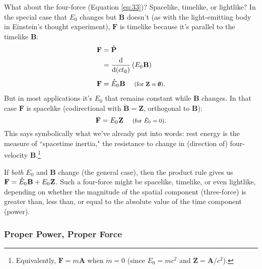 \documentclass[12pt]{article}
\renewcommand{\vv}[1]{\mathbf{#1}}
\newcommand{\dd}[1]{\mathrm{d}#1}
\begin{document}
What about the four-force (Equation \ref{eq:33})? Spacelike, timelike, or lightlike? In the special case that $E_0$ changes but $\vv B$ doesn't (as with the light-emitting body in Einstein's thought experiment), $\vv F$ is timelike because it's parallel to the timelike $\vv B$:
\begin{equation}\label{eq:38}
\begin{split}
\vv F &= \mathring{\vv P}\\
&= \frac{\dd}{\dd (c t_0)} \left( E_0 \mkern.5mu \vv B \right) \\[4pt]
\vv F &= \mathring E_0 \mkern.5mu \vv B \quad \textrm{\footnotesize{ (for $\vv Z = \textrm{\mbox{\boldmath $\emptyset$}}$)}}.
\end{split}
\end{equation}
But in most applications it's $E_0$ that remains constant while $\vv B$ changes. In that case $\vv F$ is spacelike (codirectional with $\mathring{\vv B} = \vv Z$, orthogonal to $\vv B$):
\begin{equation}\label{eq:39}
\vv F = E_0 \mkern.5mu \vv Z \quad \textrm{\footnotesize{ (for $\mathring{E}_0 = 0$)}}.
\end{equation}
This says symbolically what we've already put into words: rest energy is the measure of ``spacetime inertia," the resistance to change in (direction of) four-velocity $\vv B$.\footnote{Equivalently, $\vv F = m \vv A$ when $\mathring{m} = 0$ (since $E_0 = mc^2$ and $\vv Z = \vv A / c^2$).}

If \emph{both} $E_0$ and $\vv B$ change (the general case), then the product rule gives us $\vv F = \mathring E_0 \mkern.5mu \vv B + E_0 \mkern.5mu \vv Z$. Such a four-force might be spacelike, timelike, or even lightlike, depending on whether the magnitude of the spatial component (three-force) is greater than, less than, or equal to the absolute value of the time component (power).

\subsubsection{Proper Power, Proper Force}\label{sssec:pf}
\end{document}

